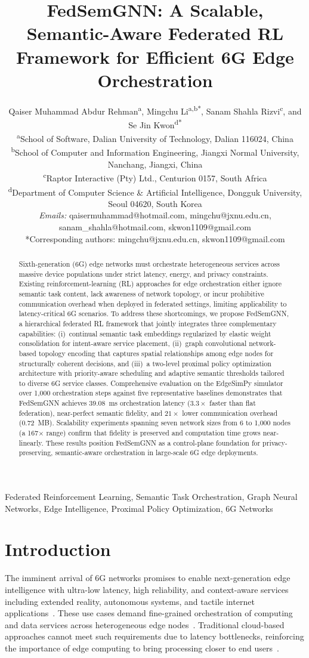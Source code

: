 \documentclass[conference]{IEEEtran}
\title{FedSemGNN: A Scalable, Semantic-Aware Federated RL Framework for Efficient 6G Edge Orchestration}
\author{
	Qaiser Muhammad Abdur Rehman\textsuperscript{a}, 
	Mingchu Li\textsuperscript{a,b*}, 
	Sanam Shahla Rizvi\textsuperscript{c}, 
	and Se Jin Kwon\textsuperscript{d*} \\[4pt]
	\textsuperscript{a}School of Software, Dalian University of Technology, Dalian 116024, China\\
	\textsuperscript{b}School of Computer and Information Engineering, Jiangxi Normal University, Nanchang, Jiangxi, China\\
	\textsuperscript{c}Raptor Interactive (Pty) Ltd., Centurion 0157, South Africa\\
	\textsuperscript{d}Department of Computer Science \& Artificial Intelligence, Dongguk University, Seoul 04620, South Korea\\[6pt]
	\textit{Emails:} qaisermuhammad@hotmail.com, mingchu@jxnu.edu.cn, 
	sanam\_shahla@hotmail.com, skwon1109@gmail.com\\[2pt]
	*Corresponding authors: mingchu@jxnu.edu.cn, skwon1109@gmail.com
}
\begin{document}
	
	\maketitle
	
	\begin{abstract}
		Sixth-generation (6G) edge networks must orchestrate heterogeneous services across massive device populations under strict latency, energy, and privacy constraints. Existing reinforcement-learning (RL) approaches for edge orchestration either ignore semantic task content, lack awareness of network topology, or incur prohibitive communication overhead when deployed in federated settings, limiting applicability to latency-critical 6G scenarios. To address these shortcomings, we propose FedSemGNN, a hierarchical federated RL framework that jointly integrates three complementary capabilities: (i)~continual semantic task embeddings regularized by elastic weight consolidation for intent-aware service placement, (ii)~graph convolutional network-based topology encoding that captures spatial relationships among edge nodes for structurally coherent decisions, and (iii)~a two-level proximal policy optimization architecture with priority-aware scheduling and adaptive semantic thresholds tailored to diverse 6G service classes. Comprehensive evaluation on the EdgeSimPy simulator over 1{,}000 orchestration steps against five representative baselines demonstrates that FedSemGNN achieves 39.08~ms orchestration latency ($3.3\times$ faster than flat federation), near-perfect semantic fidelity, and $21\times$ lower communication overhead (0.72~MB). Scalability experiments spanning seven network sizes from 6 to 1{,}000 nodes (a 167$\times$ range) confirm that fidelity is preserved and computation time grows near-linearly. These results position FedSemGNN as a control-plane foundation for privacy-preserving, semantic-aware orchestration in large-scale 6G edge deployments.
	\end{abstract}
	
	
	\begin{IEEEkeywords}
		Federated Reinforcement Learning, Semantic Task Orchestration, Graph Neural Networks, Edge Intelligence, Proximal Policy Optimization, 6G Networks
	\end{IEEEkeywords}
	
	
	\section{Introduction}
	
	The imminent arrival of 6G networks promises to enable next-generation edge intelligence with ultra-low latency, high reliability, and context-aware services including extended reality, autonomous systems, and tactile internet applications~\cite{cui2025}. These use cases demand fine-grained orchestration of computing and data services across heterogeneous edge nodes~\cite{shi2023}. Traditional cloud-based approaches cannot meet such requirements due to latency bottlenecks, reinforcing the importance of edge computing to bring processing closer to end users~\cite{vahabi2025}.
	
\end{document}
